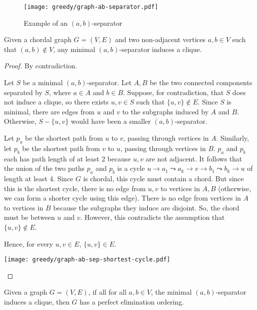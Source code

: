 \begin{figure}[htbp]
    \centering
    \texttt{[image: greedy/graph-ab-separator.pdf]}
    \caption{Example of an $(a,b)$-separator}
    \label{fig:graph-ab-separator}
\end{figure}

\begin{lemma} \label{lem:chordal-implies-separation}
    Given a chordal graph $G=(V,E)$ and two non-adjacent vertices $a,b \in V$ such that $(a,b) \not\in V$, any minimal $(a,b)$-separator induces a clique.
\end{lemma}

\begin{proof}
    By contradiction.

    Let $S$ be a minimal $(a,b)$-separator. Let $A,B$ be the two connected components separated by $S$, where $a \in A$ and $b \in B$. Suppose, for contradiction, that $S$ does not induce a clique, so there exists $u,v \in S$ such that $\{u,v\} \not\in E$. Since $S$ is minimal, there are edges from $u$ and $v$ to the subgraphs induced by $A$ and $B$. Otherwise, $S-\{u,v\}$ would have been a smaller $(a,b)$-separator.

    Let $p_a$ be the shortest path from $u$ to $v$, passing through vertices in $A$. Similarly, let $p_b$ be the shortest path from $v$ to $u$, passing through vertices in $B$. $p_a$ and $p_b$ each has path length of at least 2 because $u,v$ are not adjacent. It follows that the union of the two paths $p_a$ and $p_b$ is a cycle $u \to a_1 \leadsto a_k \to v \to b_1 \leadsto b_k \to u$ of length at least 4. Since $G$ is chordal, this cycle must contain a chord. But since this is the shortest cycle, there is no edge from $u,v$ to vertices in $A,B$ (otherwise, we can form a shorter cycle using this edge). There is no edge from vertices in $A$ to vertices in $B$ because the subgraphs they induce are disjoint. So, the chord must be between $u$ and $v$. However, this contradicts the assumption that $\{u,v\}\not\in E$.

    Hence, for every $u,v \in E$, $\{u,v\} \in E$.

    \begin{center}
        \texttt{[image: greedy/graph-ab-sep-shortest-cycle.pdf]}
    \end{center}
\end{proof}

\begin{lemma}[Dirac 1961] \label{lem:separation-implies-peo}
    Given a graph $G=(V,E)$, if all for all $a,b\in V$, the minimal $(a,b)$-separator induces a clique, then $G$ has a perfect elimination ordering.
\end{lemma}

